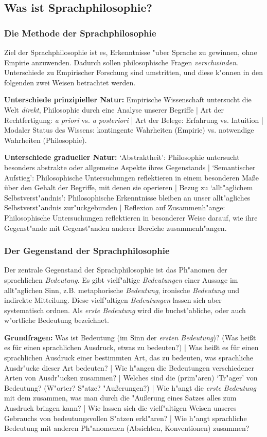 \documentclass[emulatestandardclasses]{scrartcl}
\begin{document}
\subsection{Was ist Sprachphilosophie?}
\subsubsection{Die Methode der Sprachphilosophie}

Ziel der Sprachphilosophie ist es, Erkenntnisse "uber Sprache zu gewinnen, ohne Empirie anzuwenden. Dadurch sollen philosophische Fragen \emph{verschwinden}. Unterschiede zu Empirischer Forschung sind umstritten, und diese k"onnen in den folgenden zwei Weisen betrachtet werden.

\textbf{Unterschiede prinzipieller Natur:} Empirische Wissenschaft untersucht die Welt \emph{direkt}, Philosophie durch eine Analyse unserer Begriffe | Art der Rechtfertigung: \emph{a priori} vs. \emph{a posteriori} | Art der Belege: Erfahrung vs. Intuition | Modaler Status des Wissens: kontingente Wahrheiten (Empirie) vs. notwendige Wahrheiten (Philosophie).

\textbf{Unterschiede gradueller Natur:} `Abstraktheit': Philosophie untersucht besonders abstrakte oder allgemeine Aspekte ihres Gegenstands | `Semantischer Aufstieg': Philosophische Untersuchungen reflektieren in einem besonderen Ma\ss e über den Gehalt der Begriffe, mit denen sie operieren | Bezug zu `allt"aglichem Selbstverst"andnis': Philosophische Erkenntnisse bleiben an unser allt"agliches
Selbstverst"andnis zur"uckgebunden | Reflexion auf Zusammenh"ange: Philosophische Untersuchungen reflektieren in besonderer Weise darauf, wie ihre Gegenst"ande mit Gegenst"anden anderer Bereiche zusammenh"angen.


\subsubsection{Der Gegenstand der Sprachphilosophie}

Der zentrale Gegenstand der Sprachphilosophie ist das Ph"anomen der sprachlichen \emph{Bedeutung}. Es gibt vielf"altige \emph{Bedeutungen} einer Aussage im allt"aglichen Sinn, z.B. metaphorische \emph{Bedeutung}, ironische \emph{Bedeutung} und indirekte Mitteilung. Diese vielf"altigen \emph{Bedeutungen} lassen sich aber systematisch ordnen. Als \emph{erste Bedeutung} wird die buchst"abliche, oder auch w"ortliche Bedeutung bezeichnet.

\textbf{Grundfragen:} Was ist Bedeutung (im Sinn der \emph{ersten Bedeutung})? (Was hei\ss t es für einen sprachlichen Ausdruck, etwas zu bedeuten?) | Was heißt es für einen sprachlichen Ausdruck einer bestimmten Art, das zu bedeuten, was sprachliche Ausdr"ucke dieser Art bedeuten? | Wie h"angen die Bedeutungen verschiedener Arten von Ausdr"ucken zusammen? | Welches sind die (prim"aren) `Tr"ager' von Bedeutung? (W"orter? S"atze? "Au\ss erungen?) | Wie h"angt die \emph{erste Bedeutung} mit dem zusammen, was man durch die "Au\ss erung eines Satzes alles zum Ausdruck bringen kann? | Wie lassen sich die vielf"altigen Weisen unseres Gebrauchs von bedeutungsvollen S"atzen erkl"aren? | Wie h"angt sprachliche Bedeutung mit anderen Ph"anomenen (Absichten, Konventionen) zusammen?
\end{document}
